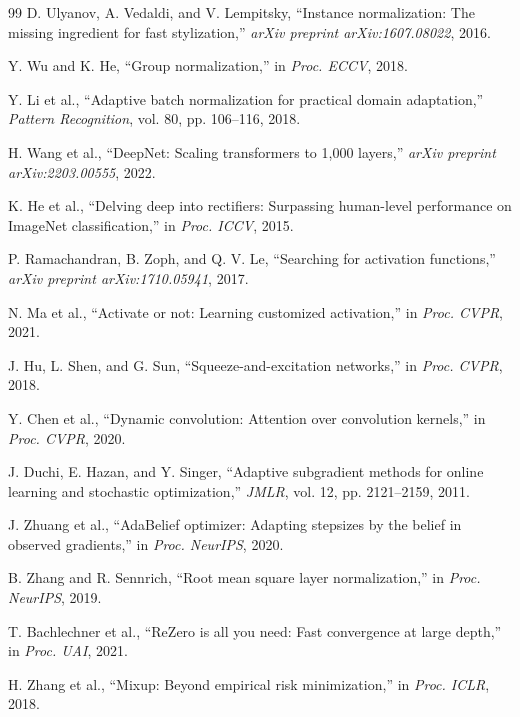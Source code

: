 \documentclass[conference]{IEEEtran}
\begin{document}
\begin{thebibliography}{99}
D. Ulyanov, A. Vedaldi, and V. Lempitsky, ``Instance normalization:
The missing ingredient for fast stylization,'' \textit{arXiv preprint
arXiv:1607.08022}, 2016.

Y. Wu and K. He, ``Group normalization,'' in \textit{Proc. ECCV}, 2018.

Y. Li et al., ``Adaptive batch normalization for practical domain
adaptation,'' \textit{Pattern Recognition}, vol. 80, pp. 106--116,
2018.

H. Wang et al., ``DeepNet: Scaling transformers to 1,000 layers,''
\textit{arXiv preprint arXiv:2203.00555}, 2022.

K. He et al., ``Delving deep into rectifiers: Surpassing human-level
performance on ImageNet classification,'' in \textit{Proc. ICCV}, 2015.

P. Ramachandran, B. Zoph, and Q. V. Le, ``Searching for activation
functions,'' \textit{arXiv preprint arXiv:1710.05941}, 2017.

N. Ma et al., ``Activate or not: Learning customized activation,'' in
\textit{Proc. CVPR}, 2021.

J. Hu, L. Shen, and G. Sun, ``Squeeze-and-excitation networks,'' in
\textit{Proc. CVPR}, 2018.

Y. Chen et al., ``Dynamic convolution: Attention over convolution
kernels,'' in \textit{Proc. CVPR}, 2020.

J. Duchi, E. Hazan, and Y. Singer, ``Adaptive subgradient methods for
online learning and stochastic optimization,'' \textit{JMLR}, vol. 12,
pp. 2121--2159, 2011.

\empty

J. Zhuang et al., ``AdaBelief optimizer: Adapting stepsizes by the
belief in observed gradients,'' in \textit{Proc. NeurIPS}, 2020.

B. Zhang and R. Sennrich, ``Root mean square layer normalization,'' in
\textit{Proc. NeurIPS}, 2019.

T. Bachlechner et al., ``ReZero is all you need: Fast convergence at
large depth,'' in \textit{Proc. UAI}, 2021.

H. Zhang et al., ``Mixup: Beyond empirical risk minimization,'' in
\textit{Proc. ICLR}, 2018.


\end{thebibliography}
\end{document}
